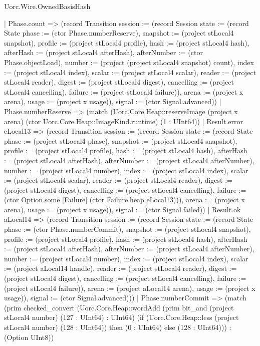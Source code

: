 \begin{lexlean}{Uorc.Wire.OwnedBasisHash}
\begin{semanticmodule}
{      | Phase.count => (record Transition {session := (record Session {state := (record State {phase := (ctor Phase.numberReserve), snapshot := (project stLocal4 snapshot), profile := (project stLocal4 profile), hash := (project stLocal4 hash), afterHash := (project stLocal4 afterHash), afterNumber := (ctor Phase.objectLoad), number := (project (project stLocal4 snapshot) count), index := (project stLocal4 index), scalar := (project stLocal4 scalar), reader := (project stLocal4 reader), digest := (project stLocal4 digest), cancelling := (project stLocal4 cancelling), failure := (project stLocal4 failure)}), arena := (project x arena), usage := (project x usage)}), signal := (ctor Signal.advanced)})
      | Phase.numberReserve => (match (Uorc.Core.Heap::reserveImage (project x arena) (ctor Uorc.Core.Heap::ImageKind.runtime) (1 : UInt64))
        | Result.error eLocal13 => (record Transition {session := (record Session {state := (record State {phase := (project stLocal4 phase), snapshot := (project stLocal4 snapshot), profile := (project stLocal4 profile), hash := (project stLocal4 hash), afterHash := (project stLocal4 afterHash), afterNumber := (project stLocal4 afterNumber), number := (project stLocal4 number), index := (project stLocal4 index), scalar := (project stLocal4 scalar), reader := (project stLocal4 reader), digest := (project stLocal4 digest), cancelling := (project stLocal4 cancelling), failure := (ctor Option.some [Failure] (ctor Failure.heap eLocal13))}), arena := (project x arena), usage := (project x usage)}), signal := (ctor Signal.failed)})
        | Result.ok aLocal14 => (record Transition {session := (record Session {state := (record State {phase := (ctor Phase.numberCommit), snapshot := (project stLocal4 snapshot), profile := (project stLocal4 profile), hash := (project stLocal4 hash), afterHash := (project stLocal4 afterHash), afterNumber := (project stLocal4 afterNumber), number := (project stLocal4 number), index := (project stLocal4 index), scalar := (project aLocal14 handle), reader := (project stLocal4 reader), digest := (project stLocal4 digest), cancelling := (project stLocal4 cancelling), failure := (project stLocal4 failure)}), arena := (project aLocal14 arena), usage := (project x usage)}), signal := (ctor Signal.advanced)}))
      | Phase.numberCommit => (match (prim checked_convert (Uorc.Core.Heap::wordAdd (prim bit_and (project stLocal4 number) (127 : UInt64) : UInt64) (if (Uorc.Core.Heap::less (project stLocal4 number) (128 : UInt64)) then (0 : UInt64) else (128 : UInt64))) : (Option UInt8))
}
\end{semanticmodule}
\end{lexlean}
